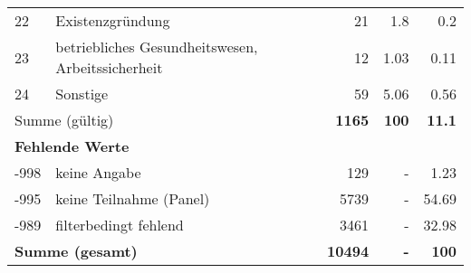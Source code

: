 \begin{longtable}{lXrrr}
        22 & \multicolumn{1}{X}{Existenzgründung} & %
          \num{21} &
          \num[round-mode=places,round-precision=2]{1.8} &
          \num[round-mode=places,round-precision=2]{0.2} \\

        23 & \multicolumn{1}{X}{betriebliches Gesundheitswesen, Arbeitssicherheit} & %
          \num{12} &
          \num[round-mode=places,round-precision=2]{1.03} &
          \num[round-mode=places,round-precision=2]{0.11} \\

        24 & \multicolumn{1}{X}{Sonstige} & %
          \num{59} &
          \num[round-mode=places,round-precision=2]{5.06} &
          \num[round-mode=places,round-precision=2]{0.56} \\

     \midrule
     \multicolumn{2}{l}{Summe (gültig)} &
       \textbf{\num{1165}} &
     \textbf{\num{100}} &
       \textbf{\num[round-mode=places,round-precision=2]{11.1}} \\
     \multicolumn{5}{l}{\textbf{Fehlende Werte}}\\
       -998 &
       keine Angabe &
         \num{129} &
        - &
         \num[round-mode=places,round-precision=2]{1.23} \\
       -995 &
       keine Teilnahme (Panel) &
         \num{5739} &
        - &
         \num[round-mode=places,round-precision=2]{54.69} \\
       -989 &
       filterbedingt fehlend &
         \num{3461} &
        - &
         \num[round-mode=places,round-precision=2]{32.98} \\
     \midrule
     \multicolumn{2}{l}{\textbf{Summe (gesamt)}} &
          \textbf{\num{10494}} &
        \textbf{-} &
        \textbf{\num{100}} \\
     \bottomrule
     \end{longtable}
     
